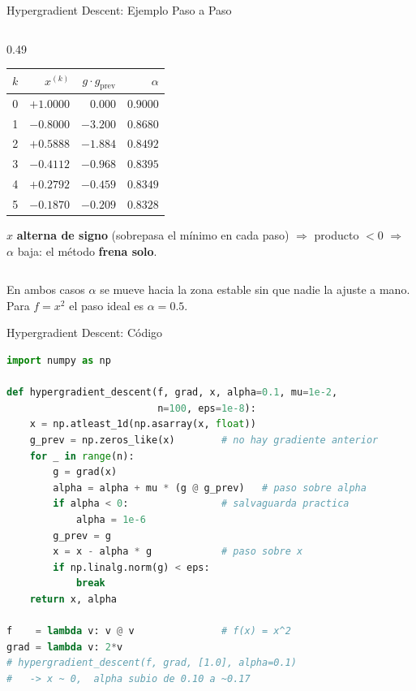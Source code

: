 \begin{frame}{Hypergradient Descent: Ejemplo Paso a Paso}
\begin{columns}[T]
\begin{column}{0.49\textwidth}
\begin{center}
            \begin{tabular}{c r r r}
                \toprule
                $k$ & $x^{(k)}$ & $g\cdot g_{\text{prev}}$ & $\alpha$ \\
                \midrule
                0 & $+1.0000$ & $0.000$  & $0.9000$ \\
                1 & $-0.8000$ & $-3.200$ & $0.8680$ \\
                2 & $+0.5888$ & $-1.884$ & $0.8492$ \\
                3 & $-0.4112$ & $-0.968$ & $0.8395$ \\
                4 & $+0.2792$ & $-0.459$ & $0.8349$ \\
                5 & $-0.1870$ & $-0.209$ & $0.8328$ \\
                \bottomrule
            \end{tabular}
            \end{center}
            \vspace{0.2em}
            \tiny
            $x$ \textbf{alterna de signo} (sobrepasa el mínimo en cada paso)
            $\Rightarrow$ producto $<0$ $\Rightarrow$ $\alpha$ baja: el método
            \textbf{frena solo}.
        \end{column}
    \end{columns}

    \vspace{0.3em}
    \scriptsize
    En ambos casos $\alpha$ se mueve hacia la zona estable sin que nadie la ajuste
    a mano. Para $f=x^{2}$ el paso ideal es $\alpha=0.5$.
\end{frame}

\begin{frame}[fragile]{Hypergradient Descent: Código}
\begin{lstlisting}[language=Python]
import numpy as np

def hypergradient_descent(f, grad, x, alpha=0.1, mu=1e-2,
                          n=100, eps=1e-8):
    x = np.atleast_1d(np.asarray(x, float))
    g_prev = np.zeros_like(x)        # no hay gradiente anterior
    for _ in range(n):
        g = grad(x)
        alpha = alpha + mu * (g @ g_prev)   # paso sobre alpha
        if alpha < 0:                # salvaguarda practica
            alpha = 1e-6
        g_prev = g
        x = x - alpha * g            # paso sobre x
        if np.linalg.norm(g) < eps:
            break
    return x, alpha

f    = lambda v: v @ v               # f(x) = x^2
grad = lambda v: 2*v
# hypergradient_descent(f, grad, [1.0], alpha=0.1)
#   -> x ~ 0,  alpha subio de 0.10 a ~0.17
\end{lstlisting}
\end{frame}
